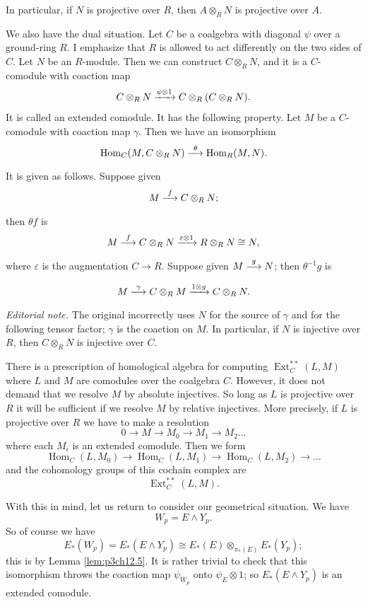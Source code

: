 \documentclass[../main]{subfiles}
\begin{document}
In particular, if $N$ is projective over $R$, then $A\otimes_R N$ is projective over $A$.

\par We also have the dual situation. Let $C$ be a coalgebra with diagonal $\psi$ over a ground-ring $R$. I emphasize that $R$ is allowed to act differently on the two sides of $C$. Let $N$ be an $R$-module. Then we can construct $C\otimes_R N$, and it is a $C$-comodule with coaction map
\[C\otimes_R N \vra{\psi\otimes 1} C\otimes_R (C\otimes_R N).\]
It is called an extended comodule. It has the following property. Let $M$ be a $C$-comodule with coaction map $\gamma$. Then we have an isomorphism
\[\operatorname{Hom}_C(M,C\otimes_R N)\vra{\theta} \operatorname{Hom}_R(M,N).\]
It is given as follows. Suppose given
\[M\vra{f}C\otimes_R N;\]
then $\theta f$ is
\[M\vra{f}C\otimes_R N\vra{\varepsilon \otimes 1} R\otimes_R N\cong N,\]
where $\varepsilon$ is the augmentation $C\longrightarrow R$. Suppose given $M\vra{g} N$; then $\theta^{-1}g$ is 
\[M\vra{\gamma} C\otimes_R M \vra{1\otimes g} C\otimes_R N.\]
\noindent\textit{Editorial note.} The original incorrectly uses $N$ for the source of $\gamma$ and for the following tensor factor; $\gamma$ is the coaction on $M$.
In particular, if $N$ is injective over $R$, then $C\otimes_R N$ is injective over $C$.

\par There is a prescription of homological algebra for computing $\operatorname{Ext}_C^{\ast\ast}(L,M)$ where $L$ and $M$ are comodules over the coalgebra $C$. However, it does not demand that we resolve $M$ by absolute injectives. So long as $L$ is projective over $R$ it will be sufficient if we resolve $M$ by relative injectives. More precisely, if $L$ is projective over $R$ we have to make a resolution 
\[0\longrightarrow M \longrightarrow M_0 \longrightarrow M_1 \longrightarrow M_2 \hdots\]
where each $M_i$ is an extended comodule. Then we form 
\[\operatorname{Hom}_C(L,M_0)\longrightarrow \operatorname{Hom}_C(L,M_1)\longrightarrow\operatorname{Hom}_C(L,M_2)\longrightarrow \hdots \]
and the cohomology groups of this cochain complex are 
\[\operatorname{Ext}_C^{\ast\ast}(L,M).\]

\par With this in mind, let us return to consider our geometrical situation. We have 
\[W_p=E\wedge Y_p.\]
So of course we have 
\[E_\ast(W_p)=E_\ast(E\wedge Y_p)\cong E_\ast(E)\otimes_{\pi_\ast(E)}E_\ast(Y_p);\]
this is by Lemma \ref{lem:p3ch12.5}. It is rather trivial to check that this isomorphism throws the coaction map $\psi_{W_p}$ onto $\psi_E\otimes 1$; so $E_\ast(E\wedge Y_p)$ is an extended comodule.
\end{document}
